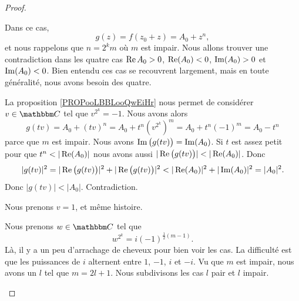 \begin{proof}
\begin{subproof}
        \item[Si \( r=n\)]

            Dans ce cas,
            \begin{equation}
                g(z)=f(z_0+z)=A_0+z^n,
            \end{equation}
            et nous rappelons que \( n=2^km\) où \( m\) est impair. Nous allons trouver une contradiction dans les quatre cas \( \operatorname{Re}{A_0}>0\), \( \real(A_0)<0\), \( \operatorname{Im}(A_0)>0\) et \( \imag(A_0)<0\). Bien entendu ces cas se recouvrent largement, mais en toute généralité, nous avons besoin des quatre.
            \begin{subproof}
                \item[Si \( \real(A_0)>0\)]
                    La proposition \ref{PROPooLBBLooQwEiHr} nous permet de considérer \( v\in \eC\) tel que \( v^{2^k}=-1\). Nous avons alors
                    \begin{equation}
                        g(tv)=A_0+(tv)^n=A_0+t^n(v^{2^k})^m=A_0+t^n(-1)^m=A_0-t^n
                    \end{equation}
                    parce que \( m\) est impair. Nous avons \( \operatorname{Im}\big( g(tv) \big)=\operatorname{Im}(A_0)\). Si \( t\) est assez petit pour que \( t^n<| \real(A_0) |\) nous avons aussi \( |\real\big( g(tv) \big)|<| \real(A_0) |\). Donc
                    \begin{equation}
                        | g(tv) |^2=| \real\big( g(tv) \big) |^2+| \real\big( g(tv) \big) |^2<| \real(A_0) |^2+| \imag(A_0) |^2=| A_0 |^2.
                    \end{equation}
                    Donc \( | g(tv) |<| A_0 |\). Contradiction.
                \item[Si \( \real(A_0)<0\)]
                    Nous prenons \( v=1\), et même histoire.
                \item[Si \( \imag(A_0)<0\)]
                    Nous prenons \( w\in \eC\) tel que
                    \begin{equation}
                        w^{2^k}=i(-1)^{\frac{ 1 }{2}(m-1)}.
                    \end{equation}
                    Là, il y a un peu d'arrachage de cheveux pour bien voir les cas. La difficulté est que les puissances de \( i\) alternent entre \( 1\), \( -1\), \( i\) et \( -i\). Vu que \( m\) est impair, nous avons un \( l\) tel que \( m=2l+1\). Nous subdivisons les cas \( l\) pair et \( l\) impair.
                    \begin{subproof}

\end{subproof}
\end{subproof}
\end{subproof}
\end{proof}
